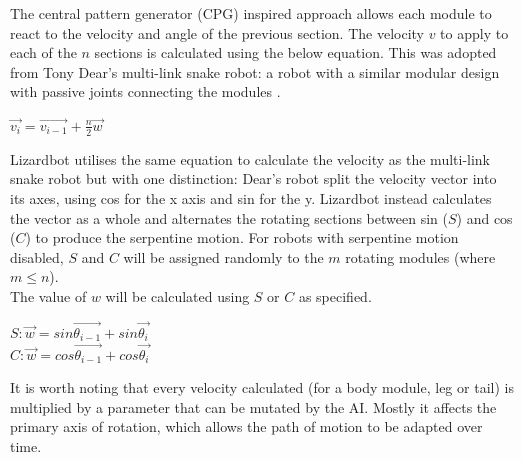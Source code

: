 \documentclass{article}
\begin{document}
The central pattern generator (CPG) inspired approach allows each module to react to the velocity and angle of the previous section.
The velocity $v$ to apply to each of the $n$ sections is calculated using the below equation. This was adopted from Tony Dear’s multi-link snake robot: a robot with a similar modular design with passive joints connecting the modules .
\begin{center}
\begin{Large}
$\overrightarrow{v_{i}} = \overrightarrow{v_{i-1}} + \frac{n}{2}\overrightarrow{w} $
\end{Large}
\end{center}

\noindent Lizardbot utilises the same equation to calculate the velocity as the multi-link snake robot but with one distinction: Dear’s robot split the velocity vector into its axes, using cos for the x axis and sin for the y. Lizardbot instead calculates the vector as a whole and alternates the rotating sections between sin ($S$) and cos ($C$) to produce the serpentine motion. For robots with serpentine motion disabled, $S$ and $C$ will be assigned randomly to the $m$ rotating modules (where $m \leq n$).\\
\newpage
\noindent The value of $w$ will be calculated using $S$ or $C$ as specified.\\
\begin{center}
\begin{Large}
$S: \overrightarrow{w} = sin\overrightarrow{\theta_{i-1}} + sin\overrightarrow{\theta_{i}}$
\\[1\baselineskip]
$C: \overrightarrow{w} = cos\overrightarrow{\theta_{i-1}} + cos\overrightarrow{\theta_{i}}$\\
\end{Large}
\end{center}

It is worth noting that every velocity calculated (for a body module, leg or tail) is multiplied by a parameter that can be mutated by the AI. Mostly it affects the primary axis of rotation, which allows the path of motion to be adapted over time.
\end{document}
